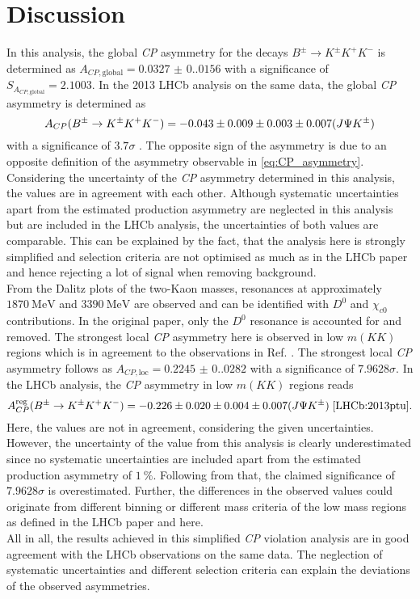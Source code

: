 \section{Discussion}
\label{sec:Discussion}
In this analysis, the global \textit{CP} asymmetry for the decays $B^\pm \to K^\pm K^+ K^-$ is determined as $A_{CP, \text{global}} = \num{0.0327(0.0156)}$ with a significance 
of $S_{A_{CP, \text{global}}} = \num{2.1003}$. In the 2013 LHCb analysis on the same data, the global \textit{CP} asymmetry is determined as 
\begin{equation*}
    A_{CP}(B^\pm \to K^\pm K^+K^-)= \num{-0.043(0.009)(0.003)} \pm \num{0.007}(J\Psi K^\pm)
\end{equation*}
with a significance of $\num{3.7}\sigma$ \cite{LHCb:2013ptu}. 
The opposite sign of the asymmetry is due to an opposite definition of the asymmetry observable in \autoref{eq:CP_asymmetry}. Considering the uncertainty of the \textit{CP} asymmetry 
determined in this analysis, the values are in agreement with each other. Although systematic uncertainties apart from the estimated production asymmetry are neglected in this 
analysis but are included in the LHCb analysis, the uncertainties of both values are comparable. This can be explained by the fact,
that the analysis here is strongly simplified and selection criteria are not optimised as much as in the LHCb paper and hence rejecting a lot of signal
when removing background.\\
From the Dalitz plots of the two-Kaon masses, resonances at approximately $\qty{1870}{\mega\eV}$ and $\qty{3390}{\mega\eV}$ are observed and 
can be identified with $D^0$ and $\chi_{c0}$ contributions. In the original paper, only the $D^0$ resonance is accounted for and removed.
The strongest local \textit{CP} asymmetry here is observed in low $m(KK)$ regions which is in agreement to the observations in Ref. \cite{LHCb:2013ptu}. 
The strongest local \textit{CP} asymmetry follows as ${A_{CP, \text{loc}}=\num{0.2245(0.0282)}}$ with a significance of $\num{7.9628}\sigma$. In the LHCb analysis, the \textit{CP} asymmetry in 
low $m(KK)$ regions reads 
\begin{equation*}
    {A^\text{reg}_{CP}(B^\pm \to K^\pm K^+K^-) = \num{-0.226(0.020)(0.004)} \pm \num{0.007}(J \Psi K^\pm)} \; \text{\cite{LHCb:2013ptu}.}
\end{equation*}
Here, the values are not in agreement, considering the given uncertainties. However, the uncertainty of the value from this analysis is clearly underestimated since no systematic 
uncertainties are included apart from the estimated production asymmetry of $\qty{1}{\percent}$. Following from that, the claimed significance of $\num{7.9628}\sigma$ is 
overestimated. Further, the differences in the observed values could originate from different binning or different mass criteria of the low mass regions as 
defined in the LHCb paper and here. \\
All in all, the results achieved in this simplified \textit{CP} violation analysis are in good agreement with the LHCb observations on the same data. The neglection of systematic uncertainties and 
different selection criteria can explain the deviations of the observed asymmetries.
